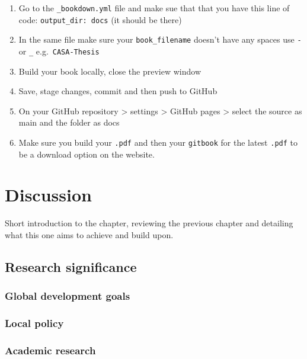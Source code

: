 \documentclass[
  12pt,
  oneside]{book}
\providecommand{\tightlist}{%
  \setlength{\itemsep}{0pt}\setlength{\parskip}{0pt}}
\begin{document}
\begin{enumerate}
\def\labelenumi{\arabic{enumi}.}
\tightlist
\item
  Go to the \texttt{\_bookdown.yml} file and make sue that that you have this line of code: \texttt{output\_dir:\ docs} (it should be there)
\item
  In the same file make sure your \texttt{book\_filename} doesn't have any spaces use \texttt{-} or \texttt{\_} e.g.~\texttt{CASA-Thesis}
\item
  Build your book locally, close the preview window
\item
  Save, stage changes, commit and then push to GitHub
\item
  On your GitHub repository \textgreater{} settings \textgreater{} GitHub pages \textgreater{} select the source as main and the folder as docs
\item
  Make sure you build your \texttt{.pdf} and then your \texttt{gitbook} for the latest \texttt{.pdf} to be a download option on the website.
\end{enumerate}

\hypertarget{discussion}{%
\chapter{Discussion}\label{discussion}}

Short introduction to the chapter, reviewing the previous chapter and detailing what this one aims to achieve and build upon.

\hypertarget{research-significance}{%
\section{Research significance}\label{research-significance}}

\hypertarget{global-development-goals}{%
\subsection{Global development goals}\label{global-development-goals}}

\hypertarget{local-policy}{%
\subsection{Local policy}\label{local-policy}}

\hypertarget{academic-research}{%
\subsection{Academic research}\label{academic-research}}
\end{document}
